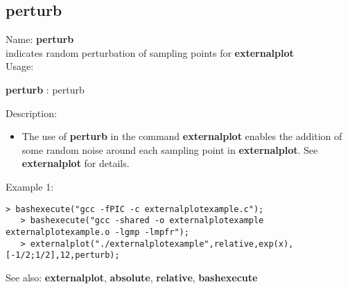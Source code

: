 \subsection{ perturb }
\noindent Name: \textbf{perturb}\\
indicates random perturbation of sampling points for \textbf{externalplot}\\

\noindent Usage: 
\begin{center}
\textbf{perturb} : \textsf{perturb}\\
\end{center}
\noindent Description: \begin{itemize}

\item The use of \textbf{perturb} in the command \textbf{externalplot} enables the addition
   of some random noise around each sampling point in \textbf{externalplot}.
   See \textbf{externalplot} for details.
\end{itemize}
\noindent Example 1: 
\begin{center}\begin{minipage}{14.8cm}\begin{Verbatim}[frame=single]
   > bashexecute("gcc -fPIC -c externalplotexample.c");
   > bashexecute("gcc -shared -o externalplotexample externalplotexample.o -lgmp -lmpfr");
   > externalplot("./externalplotexample",relative,exp(x),[-1/2;1/2],12,perturb);
\end{Verbatim}
\end{minipage}\end{center}
See also: \textbf{externalplot}, \textbf{absolute}, \textbf{relative}, \textbf{bashexecute}
